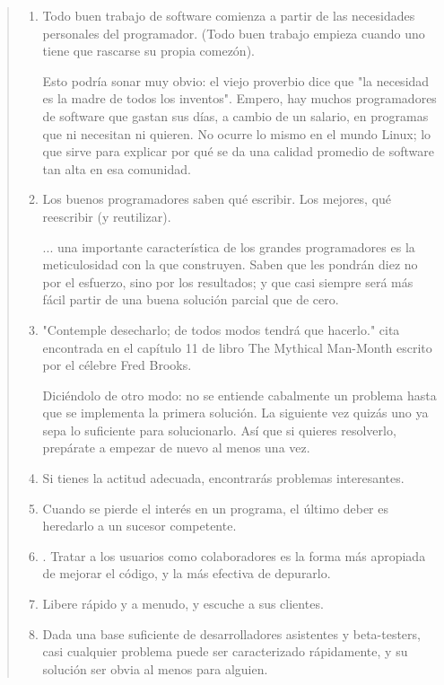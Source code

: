 \begin{quote}
\begin{enumerate}
\item Todo buen trabajo de software comienza a partir de las necesidades personales del programador. (Todo buen trabajo empieza cuando uno tiene que rascarse su propia comezón). 

Esto podría sonar muy obvio: el viejo proverbio dice que "la necesidad es la madre de todos los inventos". Empero, hay muchos programadores de software que gastan sus días, a cambio de un salario, en programas que ni necesitan ni quieren. No ocurre lo mismo en el mundo Linux; lo que sirve para explicar por qué se da una calidad promedio de software tan alta en esa comunidad.
\item Los buenos programadores saben qué escribir. Los mejores, qué reescribir (y reutilizar).

... una importante característica de los grandes programadores es la meticulosidad con la que construyen. Saben que les pondrán diez no por el esfuerzo, sino por los resultados; y que casi siempre será más fácil partir de una buena solución parcial que de cero.
\item "Contemple desecharlo; de todos modos tendrá que hacerlo." cita encontrada en el capítulo 11 de libro The Mythical Man-Month escrito por el célebre Fred Brooks.

Diciéndolo de otro modo: no se entiende cabalmente un problema hasta que se implementa la primera solución. La siguiente vez quizás uno ya sepa lo suficiente para solucionarlo. Así que si quieres resolverlo, prepárate a empezar de nuevo al menos una vez.

\item Si tienes la actitud adecuada, encontrarás problemas interesantes.

\item Cuando se pierde el interés en un programa, el último deber es heredarlo a un sucesor competente.

\item. Tratar a los usuarios como colaboradores es la forma más apropiada de mejorar el código, y la más efectiva de depurarlo.

\item Libere rápido y a menudo, y escuche a sus clientes.

\item Dada una base suficiente de desarrolladores asistentes y beta-testers, casi cualquier problema puede ser caracterizado rápidamente, y su solución ser obvia al menos para alguien.


\end{enumerate}
\end{quote}
